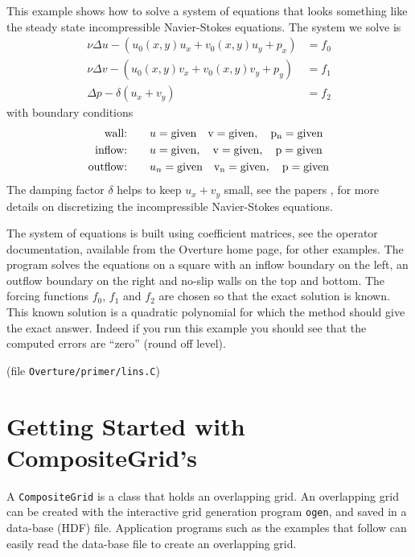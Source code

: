 \documentclass{article}
\begin{document}
This example shows how to solve a system of equations that looks something like
the steady state incompressible Navier-Stokes equations. The system we solve is
\begin{align*}
  \nu \Delta u -( u_0(x,y) u_x + v_0(x,y) u_y  + p_x ) &= f_0 \\
  \nu \Delta v -( u_0(x,y) v_x + v_0(x,y) v_y  + p_y ) &= f_1 \\
  \Delta p - \delta (u_x+v_y)                      &= f_2 
\end{align*}
with boundary conditions
\newcommand{\given}{\rm given}
\begin{align*}
   \text{wall:}&\qquad u=\given \quad v=\given, \quad p_n=\given \\
   \text{inflow:}&\qquad u=\given, \quad v=\given, \quad p=\given \\
   \text{outflow:}&\qquad u_n=\given \quad v_n=\given, \quad p=\given
\end{align*}
The damping factor $\delta$ helps to keep $u_x+v_y$ small, see the papers
 \cite{ICNS},\cite{BCNS} for more details on discretizing the incompressible
Navier-Stokes equations.

The system of equations is built using coefficient matrices, see the operator
documentation, available from the Overture home page, for other examples.
The program solves the equations on a square with an inflow boundary on the left,
an outflow boundary on the right and no-slip walls on the top and bottom.
The forcing functions $f_0$, $f_1$ and $f_2$ are chosen so that the exact solution
is known. This known solution is a quadratic polynomial for which the method should
give the exact answer. Indeed if you run this example you should see that the
computed errors are ``zero'' (round off level).



(file {\tt Overture/primer/lins.C})
{\footnotesize
{}
}




\vfill\eject
\section{Getting Started with CompositeGrid's}

A {\tt CompositeGrid} is a class that holds an overlapping grid. An
overlapping grid can be created with the interactive grid generation program
{\tt ogen}, and saved in a data-base (HDF) file. Application programs such
as the examples that follow can easily read the data-base file to create 
an overlapping grid.
\end{document}

